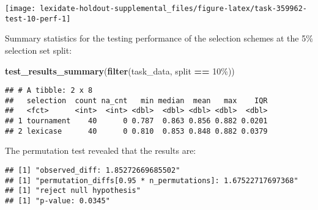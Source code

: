 \documentclass[
]{book}
\newenvironment{Shaded}{\begin{snugshade}}{\end{snugshade}}
\newcommand{\AttributeTok}[1]{\textcolor[rgb]{0.13,0.29,0.53}{#1}}
\newcommand{\DecValTok}[1]{\textcolor[rgb]{0.00,0.00,0.81}{#1}}
\newcommand{\FunctionTok}[1]{\textcolor[rgb]{0.13,0.29,0.53}{\textbf{#1}}}
\newcommand{\NormalTok}[1]{#1}
\newcommand{\OtherTok}[1]{\textcolor[rgb]{0.56,0.35,0.01}{#1}}
\newcommand{\SpecialCharTok}[1]{\textcolor[rgb]{0.81,0.36,0.00}{\textbf{#1}}}
\newcommand{\StringTok}[1]{\textcolor[rgb]{0.31,0.60,0.02}{#1}}
\begin{document}
\texttt{[image: lexidate-holdout-supplemental\_files/figure-latex/task-359962-test-10-perf-1]}

Summary statistics for the testing performance of the selection schemes at the 5\% selection set split:

\begin{Shaded}
\begin{Highlighting}[]
\FunctionTok{test\_results\_summary}\NormalTok{(}\FunctionTok{filter}\NormalTok{(task\_data, split }\SpecialCharTok{==} \StringTok{\textquotesingle{}10\%\textquotesingle{}}\NormalTok{))}
\end{Highlighting}
\end{Shaded}

\begin{verbatim}
## # A tibble: 2 x 8
##   selection  count na_cnt   min median  mean   max    IQR
##   <fct>      <int>  <int> <dbl>  <dbl> <dbl> <dbl>  <dbl>
## 1 tournament    40      0 0.787  0.863 0.856 0.882 0.0201
## 2 lexicase      40      0 0.810  0.853 0.848 0.882 0.0379
\end{verbatim}

The permutation test revealed that the results are:

\begin{Shaded}
\end{Shaded}

\begin{verbatim}
## [1] "observed_diff: 1.85272669685502"
## [1] "permutation_diffs[0.95 * n_permutations]: 1.67522717697368"
## [1] "reject null hypothesis"
## [1] "p-value: 0.0345"
\end{verbatim}
\end{document}
